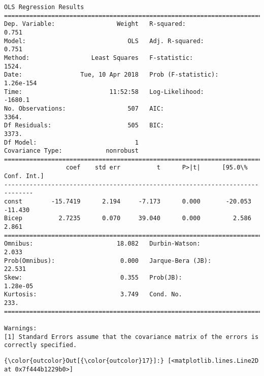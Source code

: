 \documentclass[11pt]{article}
\begin{document}
    \begin{Verbatim}[commandchars=\\\{\}]
                            OLS Regression Results                            
==============================================================================
Dep. Variable:                 Weight   R-squared:                       0.751
Model:                            OLS   Adj. R-squared:                  0.751
Method:                 Least Squares   F-statistic:                     1524.
Date:                Tue, 10 Apr 2018   Prob (F-statistic):          1.26e-154
Time:                        11:52:58   Log-Likelihood:                -1680.1
No. Observations:                 507   AIC:                             3364.
Df Residuals:                     505   BIC:                             3373.
Df Model:                           1                                         
Covariance Type:            nonrobust                                         
==============================================================================
                 coef    std err          t      P>|t|      [95.0\% Conf. Int.]
------------------------------------------------------------------------------
const        -15.7419      2.194     -7.173      0.000       -20.053   -11.430
Bicep          2.7235      0.070     39.040      0.000         2.586     2.861
==============================================================================
Omnibus:                       18.082   Durbin-Watson:                   2.033
Prob(Omnibus):                  0.000   Jarque-Bera (JB):               22.531
Skew:                           0.355   Prob(JB):                     1.28e-05
Kurtosis:                       3.749   Cond. No.                         233.
==============================================================================

Warnings:
[1] Standard Errors assume that the covariance matrix of the errors is correctly specified.

    \end{Verbatim}

\begin{Verbatim}[commandchars=\\\{\}]
{\color{outcolor}Out[{\color{outcolor}17}]:} [<matplotlib.lines.Line2D at 0x7f444b1229b0>]
\end{Verbatim}
            
    \begin{center}
    \end{center}
    { \hspace*{\fill} \\}
    
\end{document}
